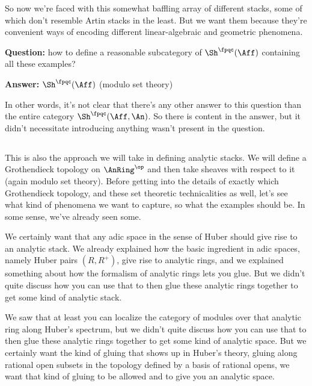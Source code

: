 So now we're faced with this somewhat baffling array of different stacks, some of which don't resemble Artin stacks in the least. But we want them because they're convenient ways of encoding different linear-algebraic and geometric phenomena. 

\textbf{Question:} how to define a reasonable subcategory of $\Sh^\fpqc(\Aff)$ containing all these examples?

\textbf{Answer:} $\Sh^\fpqc(\Aff)$ (modulo set theory)

In other words, it's not clear that there's any other answer to this question than the entire category $\Sh^\fpqc(\Aff,\An)$. So there is content in the answer, but it didn't necessitate introducing anything wasn't present in the question. 

\subsection{}
This is also the approach we will take in defining analytic stacks. We will define a Grothendieck topology on $\AnRing^\op$ and then take sheaves with respect to it (again modulo set theory). Before getting into the details of exactly which Grothendieck topology, and these set theoretic technicalities as well, let's see what kind of phenomena we want to capture, so what the examples should be. In some sense, we've already seen some.

\begin{example}
  We certainly want that any adic space in the sense of Huber should give rise to an analytic stack. We already explained how the basic ingredient in adic spaces, namely Huber pairs $(R,R^+)$, give rise to analytic rings, and we explained something about how the formalism of analytic rings lets you glue. But we didn't quite discuss how you can use that to then glue these analytic rings together to get some kind of analytic stack.

  We saw that at least you can localize the category of modules over that analytic ring along Huber's spectrum, but we didn't quite discuss how you can use that to then glue these analytic rings together to get some kind of analytic space. But we certainly want the kind of gluing that shows up in Huber's theory, gluing along rational open subsets in the topology defined by a basis of rational opens, we want that kind of gluing to be allowed and to give you an analytic space.
\end{example}
  

